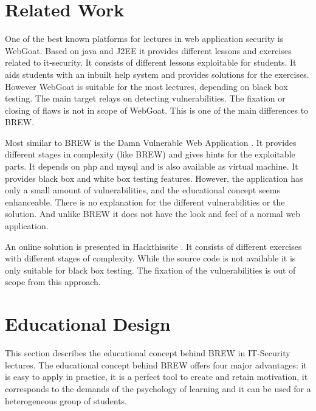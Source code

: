 \documentclass{llncs}
\begin{document}
\section{Related Work}\label{sec:rel}
One of the best known platforms for lectures in web application security is \mbox{WebGoat\cite{webgoat2014}.}
Based on java and J2EE it provides different lessons  and exercises related to it-security.
It consists of different lessons exploitable for students.
It aids students with an inbuilt help system and provides solutions for the exercises.
However WebGoat is suitable for the most lectures, depending on black box testing.
The main target relays on detecting vulnerabilities.
The fixation or closing of flaws is not in scope of WebGoat.
This is one of the main differences to BREW.

Most similar to BREW is the Damn Vulnerable Web Application \cite{dvwa2014}.
It provides different stages in complexity (like BREW) and gives hints for the exploitable parts.
It depends on php and mysql and is also available as virtual machine.
It provides black box and white box testing features.
However, the application has only a small amount of vulnerabilities, and the educational concept seems enhanceable.
There is no explanation for the different vulnerabilities or the solution.
And unlike BREW it does not have the look and feel of a normal web application.

An online solution is presented in Hackthissite \cite{hackthissite2014}.
It consists of different exercises with different stages of complexity.
While the source code is not available it is only suitable for black box testing.
The fixation of the vulnerabilities is out of scope from this approach.


\section{Educational Design}\label{sec:eddesign}
This section describes the educational concept behind BREW in IT-Security lectures. 
The educational concept behind BREW offers four major advantages: it is easy to apply in practice, it is a perfect tool to create and retain motivation, it corresponds to the demands of the psychology of learning and it can be used for a heterogeneous group of students. 
\end{document}

